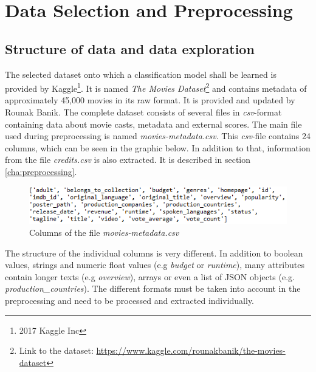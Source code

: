 \chapter{Data Selection and Preprocessing}
\label{cha:data_selection}

\section{Structure of data and data exploration}
\label{sec:data_exploration}
The selected dataset onto which a classification model shall be learned is provided by Kaggle\footnote{2017 Kaggle Inc}. It is named \textit{The Movies Dataset}\footnote{Link to the dataset: \hyperref[https://www.kaggle.com/rounakbanik/the-movies-dataset]{https://www.kaggle.com/rounakbanik/the-movies-dataset}} and contains metadata of approximately 45,000 movies in its raw format. It is provided and updated by Rounak Banik. The complete dataset consists of several files in \textit{csv}-format containing data about movie casts, metadata and external scores. The main file used during preprocessing is named \textit{movies-metadata.csv}. This \textit{csv}-file contains 24 columns, which can be seen in the graphic below. In addition to that, information from the file \textit{credits.csv} is also extracted. It is described in section \ref{cha:preprocessing}.
\begin{figure}[ht]
	\centering
		\includegraphics[width=\textwidth]{images/Raw_dataset_headers.png}
	\caption{Columns of the file \textit{movies-metadata.csv}}
\end{figure}


The structure of the individual columns is very different. In addition to boolean values, strings and numeric float values (e.g \textit{budget} or \textit{runtime}), many attributes contain longer texts (e.g \textit{overview}), arrays or even a list of JSON objects (e.g. \textit{production\_countries}). The different formats must be taken into account in the preprocessing and need to be processed and extracted individually.

